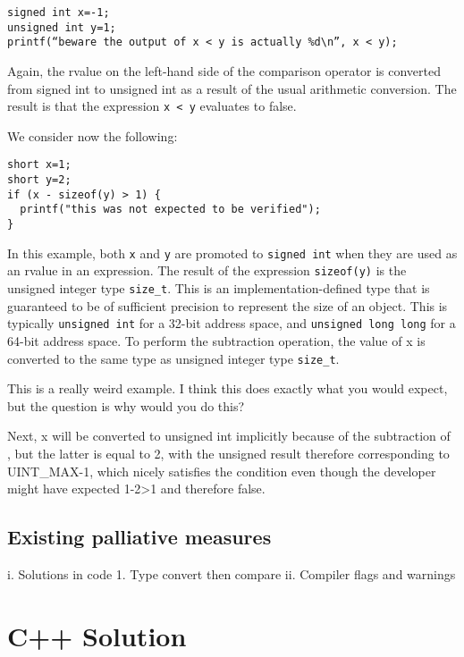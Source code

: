 \documentclass[11pt,letterpaper]{article}
\begin{document}
\begin{lstlisting}[style=CStyle]
signed int x=-1;
unsigned int y=1;
printf(“beware the output of x < y is actually %d\n”, x < y);
\end{lstlisting}

Again, the rvalue on the left-hand side of the comparison operator is converted from signed int to unsigned int as a result of the usual arithmetic conversion.
The result is that the expression \texttt{x < y} evaluates to false.

We consider now the following:

\begin{lstlisting}[style=CStyle]
short x=1;
short y=2;
if (x - sizeof(y) > 1) {
  printf("this was not expected to be verified");
}
\end{lstlisting}

In this example, both \texttt{x} and \texttt{y} are promoted to \texttt{signed int} when they are used as an rvalue in an expression.
The result of the expression \texttt{sizeof(y)} is the unsigned integer type \texttt{size_t}.
This is an implementation-defined type that is guaranteed to be of sufficient precision to represent the size of an object.
This is typically \texttt{unsigned int} for a 32-bit address space, and \texttt{unsigned long long} for a 64-bit address space.
To perform the subtraction operation, the value of {x} is converted to the same type as unsigned integer type \texttt{size_t}.

This is a really weird example. I think this does exactly what you would expect, but the question is why would you do this?

Next, x will be converted to unsigned int implicitly because of the subtraction of , but the latter is equal to 2, with the unsigned result therefore corresponding to UINT\_MAX-1, which nicely satisfies the condition even though the developer might have expected 1-2>1 and therefore false.

\subsection{Existing palliative measures}


i.	Solutions in code
1.	Type convert then compare
ii.	Compiler flags and warnings

\section{C++ Solution}
\label{sec:cppimplementation}
\end{document}

